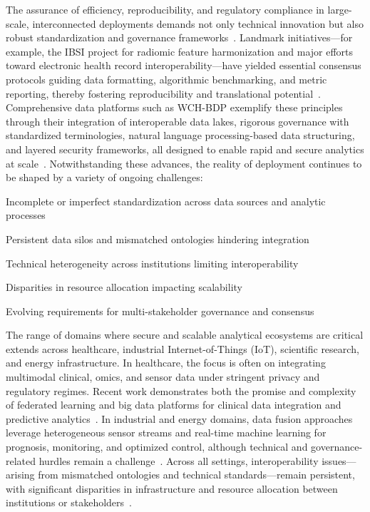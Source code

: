 \documentclass[sigconf]{acmart}
\begin{document}
The assurance of efficiency, reproducibility, and regulatory compliance in large-scale, interconnected deployments demands not only technical innovation but also robust standardization and governance frameworks~\cite{ref4,ref33,ref41,ref43,ref51,ref54,ref61,ref62,ref64,ref65,ref70,ref71,ref72,ref75,ref77,ref79,ref80,ref84,ref106,ref107}. Landmark initiatives—for example, the IBSI project for radiomic feature harmonization and major efforts toward electronic health record interoperability—have yielded essential consensus protocols guiding data formatting, algorithmic benchmarking, and metric reporting, thereby fostering reproducibility and translational potential~\cite{ref40,ref41,ref104}. Comprehensive data platforms such as WCH-BDP exemplify these principles through their integration of interoperable data lakes, rigorous governance with standardized terminologies, natural language processing-based data structuring, and layered security frameworks, all designed to enable rapid and secure analytics at scale~\cite{ref36}. Notwithstanding these advances, the reality of deployment continues to be shaped by a variety of ongoing challenges:

Incomplete or imperfect standardization across data sources and analytic processes

Persistent data silos and mismatched ontologies hindering integration

Technical heterogeneity across institutions limiting interoperability

Disparities in resource allocation impacting scalability

Evolving requirements for multi-stakeholder governance and consensus

The range of domains where secure and scalable analytical ecosystems are critical extends across healthcare, industrial Internet-of-Things (IoT), scientific research, and energy infrastructure. In healthcare, the focus is often on integrating multimodal clinical, omics, and sensor data under stringent privacy and regulatory regimes. Recent work demonstrates both the promise and complexity of federated learning and big data platforms for clinical data integration and predictive analytics~\cite{ref36,ref84,ref90,ref51,ref54}. In industrial and energy domains, data fusion approaches leverage heterogeneous sensor streams and real-time machine learning for prognosis, monitoring, and optimized control, although technical and governance-related hurdles remain a challenge~\cite{ref71,ref72,ref75,ref76,ref77}. Across all settings, interoperability issues—arising from mismatched ontologies and technical standards—remain persistent, with significant disparities in infrastructure and resource allocation between institutions or stakeholders~\cite{ref82,ref84}.
\end{document}
